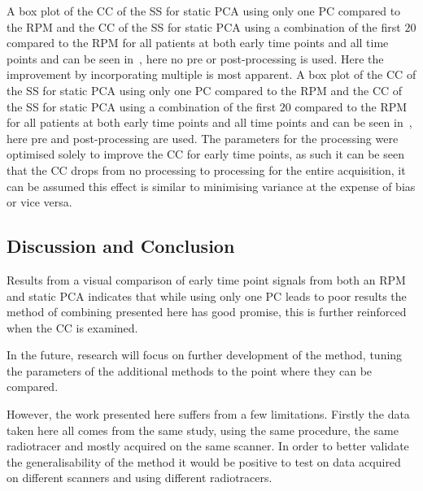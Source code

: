             A box plot of the \gls{CC} of the \gls{SS} for static \gls{PCA} using only one \gls{PC} compared to the \gls{RPM} and the \gls{CC} of the \gls{SS} for static \gls{PCA} using a combination of the first $20$  compared to the \gls{RPM} for all patients at both early time points and all time points and  can be seen in~, here no pre or post-processing is used. Here the improvement by incorporating multiple  is most apparent. A box plot of the \gls{CC} of the \gls{SS} for static \gls{PCA} using only one \gls{PC} compared to the \gls{RPM} and the \gls{CC} of the \gls{SS} for static \gls{PCA} using a combination of the first $20$  compared to the \gls{RPM} for all patients at both early time points and all time points and  can be seen in~, here pre and post-processing are used. The parameters for the processing were optimised solely to improve the \gls{CC} for early time points, as such it can be seen that the \gls{CC} drops from no processing to processing for the entire acquisition, it can be assumed this effect is similar to minimising variance at the expense of bias or vice versa.
            
        \subsection{Discussion and Conclusion} \label{sec:pca_data_driven_surrogate_signal_extraction_methods_for_dynamic_pet_discussion_and_conclusion}
            Results from a visual comparison of early time point signals from both an \gls{RPM} and static \gls{PCA} indicates that while using only one \gls{PC} leads to poor results the method of combining  presented here has good promise, this is further reinforced when the \gls{CC} is examined.
            
            In the future, research will focus on further development of the method, tuning the parameters of the additional methods to the point where they can be compared.
            
            However, the work presented here suffers from a few limitations. Firstly the data taken here all comes from the same study, using the same procedure, the same radiotracer and mostly acquired on the same scanner. In order to better validate the generalisability of the method it would be positive to test on data acquired on different scanners and using different radiotracers.
            
